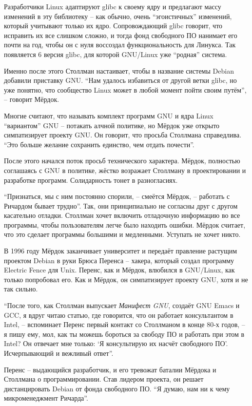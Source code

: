 Разработчики Linux адаптируют glibc к своему ядру и предлагают массу изменений в эту библиотеку -- как обычно, очень \enquote{эгоистичных} изменений, который учитывают только их ядро. Сопровождающий glibc говорит, что исправить их все слишком сложно, и тогда фонд свободного ПО нанимает его почти на год, чтобы он с нуля воссоздал функциональность для Линукса. Так появляется 6 версия glibc, для которой GNU/Linux уже \enquote{родная} система.

Именно после этого Столлман настаивает, чтобы в название системы Debian добавили приставку GNU. \enquote{Нам удалось избавиться от другой ветки glibc, но уже понятно, что сообщество Linux может в любой момент пойти своим путём}, -- говорит Мёрдок.

Многие считают, что называть комплект программ GNU и ядра Linux \enquote{вариантом} GNU -- потакать алчной политике, но Мёрдок уже открыто симпатизирует проекту GNU. Он говорит, что просьба Столлмана справедлива. \enquote{Это больше желание сохранить единство, чем отдать почести}.

После этого начался поток просьб технического характера. Мёрдок, полностью соглашаясь с GNU в политике, жёстко возражает Столлману в проектировании и разработке программ. Солидарность тонет в разногласиях.

\enquote{Признаться, мы с ним постоянно спорили, -- смеётся Мёрдок, -- работать с Ричардом бывает трудно}. Так, они принципиально не согласны друг с другом касательно отладки. Столлман хочет включить отладочную информацию во все программы, чтобы пользователям легче было находить ошибки. Мёрдок считает, что это сделает программы большими и медленными. Уступать не хочет никто.

В 1996 году Мёрдок заканчивает университет и передаёт правление растущим проектом Debian в руки Брюса Перенса -- хакера, который создал программу Electric Fence для Unix. Перенс, как и Мёрдок, влюбился в GNU/Linux, как только попробовал его. Как и Мёрдок, он симпатизирует проекту GNU, хотя и не так сильно.

\enquote{После того, как Столлман выпускает \textit{Манифест GNU}, создаёт GNU Emacs и GCC, я вдруг читаю статью, где говорится, что он работает консультантом в Intel, -- вспоминает Перенс первый контакт со Столлманом в конце 80-х годов, -- я пишу ему, мол, как ты можешь бороться за свободу ПО и работать при этом в Intel? Он отвечает мне только: \enquote{Я консультирую их насчёт свободного ПО}. Исчерпывающий и вежливый ответ}.

Перенс -- выдающийся разработчик, и его тревожат баталии Мёрдока и Столлмана о программировании. Став лидером проекта, он решает дистанцировать Debian от фонда свободного ПО. \enquote{Я думаю, нам ни к чему микроменеджмент Ричарда}.

